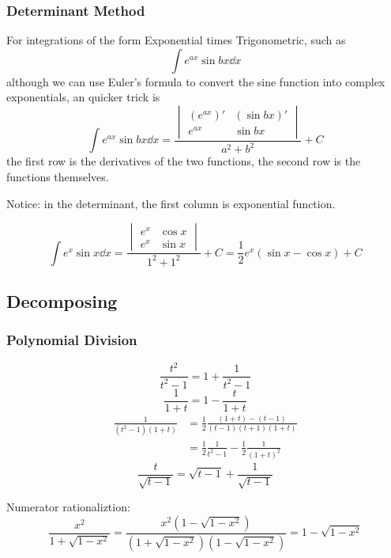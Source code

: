 \documentclass{overview}
\begin{document}
\subsubsection{Determinant Method}
For integrations of the form Exponential times Trigonometric, such as
\[
	\int e^{ax} \sin bx \dd x
\]
although we can use Euler's formula to convert the sine function into complex exponentials,
an quicker trick is 
\[
	\int e^{ax} \sin bx \dd x = \frac{\begin{vmatrix}
			(e^{ax})' & ( \sin bx )' \\
			e^{ax} & \sin bx
	\end{vmatrix}}{a^2 + b^2} + C
\] 
the first row is the derivatives of the two functions, the second row is the
functions themselves. 

Notice: in the determinant, the first column is exponential function. 
\begin{example}
	\[
	\int e^{x} \sin x \dd x = \frac{\begin{vmatrix}
			e^{x} & \cos x \\
			e^{x} & \sin x
	\end{vmatrix}}{1^2 + 1^2} + C
	= \frac{1}{2} e^{x} (\sin x - \cos x) + C
	\] 
\end{example}
	
\subsection{Decomposing}

\subsubsection{Polynomial Division}
\[
	\frac{t^2}{t^2-1}=1+\frac{1}{t^2-1}
\] 
\[
	\frac{1}{1+t} = 1 - \frac{t}{1+t}
\] 
\[
	\begin{aligned}
	\frac{1}{(t^2-1)(1+t)} 
	&= \frac{1}{2}\frac{(1+t)-(t-1)}{(t-1)(t+1)(1+t)} \\
	&= \frac{1}{2}\frac{1}{t^2-1} - \frac{1}{2}\frac{1}{(1+t)^2}
	\end{aligned}
\] 
\[
	\frac{t}{\sqrt{t-1}} = \sqrt{t-1} + \frac{1}{\sqrt{t-1}}
\] 

Numerator rationaliztion:
\[
	\frac{x^2}{1+\sqrt{1-x^2}} = \frac{x^2(1-\sqrt{1-x^2})}{(1+\sqrt{1-x^2})(1-\sqrt{1-x^2})}
	= 1 - \sqrt{1-x^2}
\] 
\end{document}
